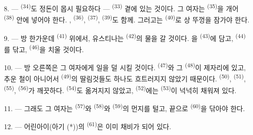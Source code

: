 \VUsaut{5.0mm}
\VUsaut{3.0mm}

8. ---  \textsuperscript{(34)}도 정돈이 몹시 필요하다 — 
\textsuperscript{(33)} 곁에 있는 것이다. 그 여자는 
\textsuperscript{(35)}을 개어  \textsuperscript{(38)} 안에 넣어야 한다.
,  \textsuperscript{(36)},  \textsuperscript{(37)},
 \textsuperscript{(39)}도 함께. 그러고는  \textsuperscript{(40)}로
상 뚜껑을 잠가야 한다.

9. --- 방 한가운데  \textsuperscript{(41)} 위에서, 유스티나는
 \textsuperscript{(42)}의 물을 갈 것이다. 을 
\textsuperscript{(43)}에 담고,  \textsuperscript{(44)}를 닦고,
 \textsuperscript{(46)}을 치울 것이다.

10. --- 방 오른쪽은 그 여자에게 일을 덜 시킬 것이다. 
\textsuperscript{(47)}와 그  \textsuperscript{(48)}이 제자리에 있고, 추운
철이 아니어서  \textsuperscript{(49)}의 딸림것들도 하나도 흐트러지지 않았기
때문이다.  \textsuperscript{(50)},  \textsuperscript{(51)},
 \textsuperscript{(55)},  \textsuperscript{(56)}가 깨끗하다.
 \textsuperscript{(54)}도 옮겨지지 않았고, 
\textsuperscript{(52)}에는  \textsuperscript{(53)}이 넉넉히 채워져 있다.



11. --- 그래도 그 여자는  \textsuperscript{(57)}와 
\textsuperscript{(58)}와  \textsuperscript{(59)}의 먼지를 털고, 끝으로
 \textsuperscript{(60)}을 닦아야 한다.

12. --- 어린아이(아기 (*))의  \textsuperscript{(61)}은 이미 채비가 되어 있다.

\VUsaut{5.0mm}
\VUsaut{3.0mm}

